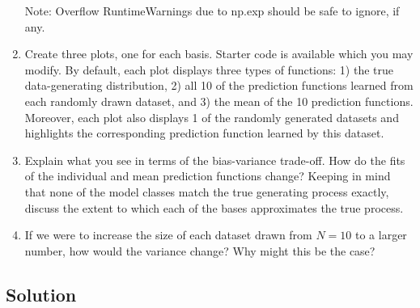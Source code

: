 \documentclass[submit]{harvardml}
\begin{document}
\begin{problem}
\begin{enumerate}
   Note: Overflow RuntimeWarnings due to np.exp should be safe to ignore, if any.

\item Create three plots, one for each basis. Starter code is available which you may modify.
By default, each plot displays three types of functions:
1) the true data-generating distribution,
2) all 10 of the prediction functions learned from each randomly drawn dataset, and
3) the mean of the 10 prediction functions.
Moreover, each plot also displays 1 of the randomly generated datasets and highlights the corresponding prediction function learned by this dataset.

\item Explain what you see in terms of the bias-variance trade-off.
How do the fits of the individual and mean prediction functions change?
Keeping in mind that none of the model classes match the true generating process exactly, discuss the extent to which each of the bases approximates the true process.

\item If we were to increase the size of each dataset drawn from $N = 10$ to a larger number, how would the variance change? Why might this be the case?

\end{enumerate}

\end{problem}

\newpage

\subsection*{Solution}
\end{document}
